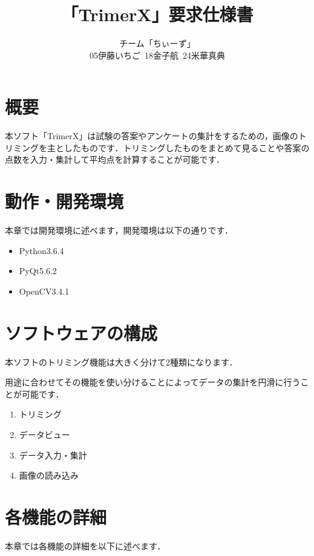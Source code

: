 \documentclass[12pt]{jsreport}
\title{「TrimerX」要求仕様書}
\author{チーム「ちぃーず」\\05伊藤いちご\ 18金子航\ 24米華真典}
\date{}
\begin{document}
\maketitle
\newpage

\setcounter{tocdepth}{2}
\tableofcontents

\newpage

\setcounter{page}{1}

\section{概要}
本ソフト「TrimerX」は試験の答案やアンケートの集計をするための，画像のトリミングを主としたものです．トリミングしたものをまとめて見ることや答案の点数を入力・集計して平均点を計算することが可能です．

\newpage

\section{動作・開発環境}
本章では開発環境に述べます，開発環境は以下の通りです．
\begin{itemize}
    \item Python3.6.4
    \item PyQt5.6.2
    \item OpenCV3.4.1
\end{itemize}

\newpage


\section{ソフトウェアの構成}
本ソフトのトリミング機能は大きく分けて2種類になります．

用途に合わせてその機能を使い分けることによってデータの集計を円滑に行うことが可能です．
\begin{enumerate}
    \item トリミング
    \item データビュー
    \item データ入力・集計
    \item 画像の読み込み
\end{enumerate}

\newpage

\section{各機能の詳細}
本章では各機能の詳細を以下に述べます．
\end{document}
